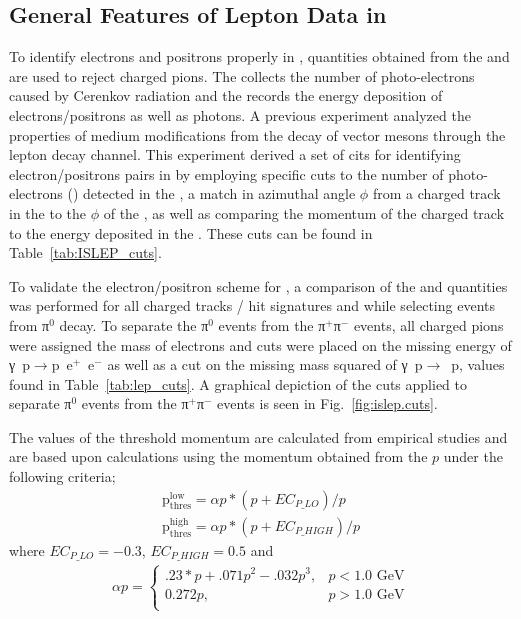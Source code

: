 \subsection{\label{sec:data.lepton}General Features of Lepton Data in }

To identify electrons and positrons properly in , quantities obtained from the  and  are used to reject charged pions. The  collects the number of photo-electrons caused by Cerenkov radiation and the  records the energy deposition of electrons/positrons as well as photons. A previous  experiment  analyzed the properties of medium modifications from the decay of vector mesons through the lepton decay channel. This experiment derived a set of cits for identifying electron/positrons pairs in  by employing specific cuts to the number of photo-electrons () detected in the , a match in azimuthal angle $\phi$ from a charged track in the  to the $\phi$ of the , as well as comparing the momentum of the charged track to the energy deposited in the . These cuts can be found in Table~\ref{tab:ISLEP_cuts}.

To validate the  electron/positron  scheme for , a comparison of  the  and  quantities was performed for all charged tracks / hit signatures and while selecting events from π$^0$ decay. To separate the π$^0$ events from the π$^+$π$^-$ events, all charged pions were assigned the mass of electrons and cuts were placed on the missing energy of \mbox{γ p$\rightarrow$p e$^+$ e$^-$} as well as a cut on the missing mass squared of \mbox{γ p$\rightarrow$ p}, values found in Table~\ref{tab:lep_cuts}. A graphical depiction of the cuts applied to separate π$^0$ events from the π$^+$π$^-$ events is seen in Fig.~\ref{fig:islep.cuts}.

The values of the threshold momentum are calculated from empirical studies and are based upon calculations using the momentum obtained from the $p$ under the following criteria;
\begin{align}
\mathrm{p_{thres}^{low}} = \alpha p *(p+EC_{P\_LO})/p \nonumber \\
\mathrm{p_{thres}^{high}} = \alpha p *(p+EC_{P\_HIGH})/p \nonumber
\end{align}
where $EC_{P\_LO} = -0.3$, $EC_{P\_HIGH} = 0.5$ and
\begin{align}
\alpha p =
\begin{cases}
.23*p + .071p^2 - .032p^3, & p<1.0 \text{~GeV} \\
0.272p, & p>1.0 \text{~GeV} \\
\end{cases}\nonumber
\end{align}


